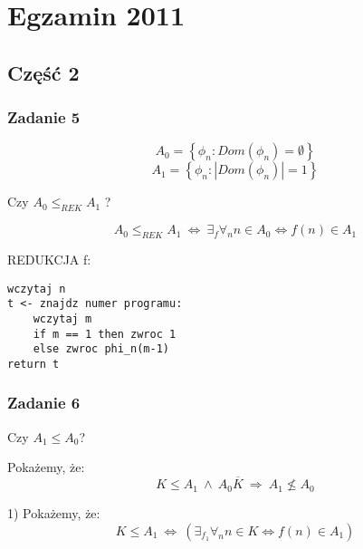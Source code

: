 \documentclass[svgnames]{report}
\begin{document}
\chapter{Egzamin 2011}
\section{Część 2}
\subsection{Zadanie 5}
\begin{framed}
\begin{equation*}
A_0 = \left\{ \phi_n : Dom(\phi_n) = \emptyset \right\}
\end{equation*}
\begin{equation*}
A_1 = \left\{ \phi_n : |Dom(\phi_n)| = 1 \right\}
\end{equation*}

Czy $A_0 \leqslant_{REK} A_1$ ?
\end{framed}

\begin{equation*}
A_0 \leqslant_{REK} A_1 \ \Leftrightarrow \ \exists_f \forall_n n \in A_0 \Leftrightarrow f(n) \in A_1
\end{equation*}

REDUKCJA f:
\begin{lstlisting}
wczytaj n
t <- znajdz numer programu:
	wczytaj m
	if m == 1 then zwroc 1
	else zwroc phi_n(m-1)
return t
\end{lstlisting}
	

\subsection{Zadanie 6}
\begin{framed}
	Czy $A_1 \leqslant A_0$?
\end{framed}

Pokażemy, że:
\begin{equation}
	K \leqslant A_1 \ \wedge \ A_0 \overline{K} \ \Rightarrow \ A_1 \not\leqslant A_0
\end{equation}

1) Pokażemy, że: 
\begin{equation*}
K \leqslant A_1 \ \Leftrightarrow \ (\exists_{f_1} \forall_n n \in K \Leftrightarrow f(n) \in A_1)
\end{equation*}
\end{document}
